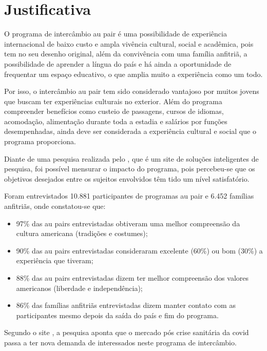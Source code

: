 \section{Justificativa}

    O programa de intercâmbio au pair é uma possibilidade de experiência internacional de baixo custo e ampla vivência cultural, social e acadêmica, pois tem no seu desenho original, além da convivência com uma família anfitriã, a possibilidade de aprender a língua do país e há ainda a oportunidade de frequentar um espaço educativo, o que amplia muito a experiência como um todo. 
    
    Por isso, o intercâmbio au pair tem sido considerado vantajoso por muitos jovens que buscam ter experiências culturais no exterior. Além do programa compreender benefícios como custeio de passagens, cursos de idiomas, acomodação, alimentação durante toda a estadia e salários por funções desempenhadas, ainda deve ser considerada a experiência cultural e social que o programa proporciona. 
    
    Diante de uma pesquisa realizada pelo
    \cite{eurekaFacts2020}, que é um site de soluções inteligentes de pesquisa, foi possível mensurar o impacto do programa, pois percebeu-se que os objetivos desejados entre os sujeitos envolvidos têm tido um nível satisfatório.
    
    Foram entrevistados 10.881 participantes de programas au pair e 6.452 famílias anfitriãs, onde constatou-se que:
    
    \begin{itemize}
        \item 97\% das au pairs entrevistadas obtiveram uma melhor compreensão da cultura americana (tradições e costumes);
        \item 90\% das au pairs entrevistadas consideraram excelente (60\%) ou bom (30\%) a experiência que tiveram;
        \item 88\% das au pairs entrevistadas dizem ter melhor compreensão dos valores americanos (liberdade e independência); 
        \item 86\% das famílias anfitriãs entrevistadas dizem manter contato com as participantes mesmo depois da saída do país e fim do programa.
    \end{itemize}
    
    Segundo o site \cite{valorIveste2022}, a pesquisa aponta que o mercado pós crise sanitária da \ac{covid} passa a ter nova demanda de interessados neste programa de intercâmbio. 
    
